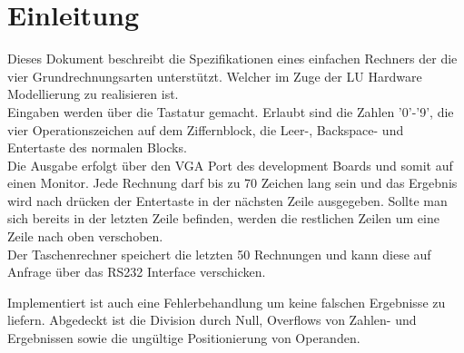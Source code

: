 \section{Einleitung}

Dieses Dokument beschreibt die Spezifikationen eines einfachen Rechners der die vier Grundrechnungsarten unterstützt.
Welcher im Zuge der LU Hardware Modellierung zu realisieren ist.\\ 
Eingaben werden über die Tastatur gemacht. Erlaubt sind die Zahlen '0'-'9', die vier Operationszeichen auf dem Ziffernblock, 
die Leer-, Backspace- und Entertaste des normalen Blocks.\\
Die Ausgabe erfolgt über den VGA Port des development Boards und somit auf einen Monitor. Jede Rechnung darf bis zu 70 Zeichen lang sein und das Ergebnis wird nach drücken der Entertaste 
in der nächsten Zeile ausgegeben. Sollte man sich bereits in der letzten Zeile befinden, werden die restlichen Zeilen um eine Zeile nach oben
verschoben.\\
Der Taschenrechner speichert die letzten 50 Rechnungen und kann diese auf Anfrage über das RS232 Interface verschicken.

Implementiert ist auch eine Fehlerbehandlung um keine falschen Ergebnisse zu liefern. Abgedeckt ist die Division durch Null, Overflows von
Zahlen- und Ergebnissen sowie die ungültige Positionierung von Operanden.
